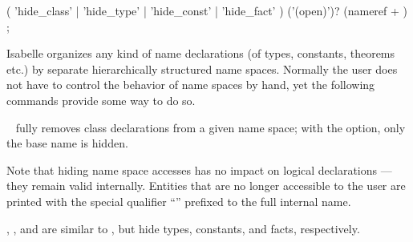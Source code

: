 \begin{isabellebody}
\begin{isamarkuptext}
  \begin{rail}
    ( 'hide_class' | 'hide_type' | 'hide_const' | 'hide_fact' ) ('(open)')? (nameref + )
    ;
  \end{rail}

  Isabelle organizes any kind of name declarations (of types,
  constants, theorems etc.) by separate hierarchically structured name
  spaces.  Normally the user does not have to control the behavior of
  name spaces by hand, yet the following commands provide some way to
  do so.

  \begin{description}

  \item \hyperlink{command.hide-class}{\mbox{}}~ fully removes class
  declarations from a given name space; with the 
  option, only the base name is hidden.

  Note that hiding name space accesses has no impact on logical
  declarations --- they remain valid internally.  Entities that are no
  longer accessible to the user are printed with the special qualifier
  ``'' prefixed to the full internal name.

  \item \hyperlink{command.hide-type}{\mbox{}}, \hyperlink{command.hide-const}{\mbox{}}, and \hyperlink{command.hide-fact}{\mbox{}} are similar to \hyperlink{command.hide-class}{\mbox{}}, but hide types,
  constants, and facts, respectively.
  
  \end{description}%
\end{isamarkuptext}%
\isamarkuptrue%
%
\isadelimtheory
%
\endisadelimtheory
%
\isatagtheory
{}\isamarkupfalse%
%
\endisatagtheory
{\isafoldtheory}%
%
\isadelimtheory
%
\endisadelimtheory
\isanewline
\end{isabellebody}%
